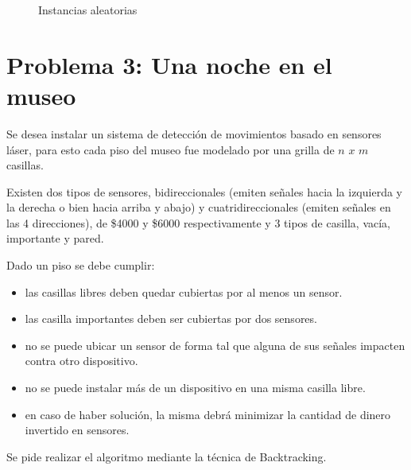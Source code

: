 \documentclass[a4paper, 10pt, twoside]{article}
\newcommand{\tresgraficos}[3]{
    \newcommand{\separacion}{-2.2em}
    \vspace{\separacion}
    
    \vspace{\separacion}
    
    \vspace{\separacion}
    
}
\begin{document}
\begin{figure}[H]
  \centering
  \tresgraficos{problema2-instancias-aleatorias}
               {problema2-instancias-aleatorias-logn}
               {problema2-instancias-aleatorias-n}
  \caption{Instancias aleatorias}
\end{figure}




\newpage

\section{Problema 3: Una noche en el museo}
Se desea instalar un sistema de detección de movimientos basado en sensores láser, para esto cada piso del museo fue modelado por una grilla de $n$ $x$ $m$ casillas.

Existen dos tipos de sensores, bidireccionales (emiten señales hacia la izquierda y la derecha o bien hacia arriba y abajo) y cuatridireccionales (emiten señales en las 4 direcciones), de \$4000 y \$6000 respectivamente y 3 tipos de casilla, vacía, importante y pared.

Dado un piso se debe cumplir:

\begin{itemize}
\item las casillas libres deben quedar cubiertas por al menos un sensor.
\item las casilla importantes deben ser cubiertas por dos sensores.
\item no se puede ubicar un sensor de forma tal que alguna de sus señales impacten contra otro dispositivo.
\item no se puede instalar más de un dispositivo en una misma casilla libre.
\item en caso de haber solución, la misma debrá minimizar la cantidad de dinero invertido en sensores.
\end{itemize}

Se pide realizar el algoritmo mediante la técnica de Backtracking.
\end{document}
